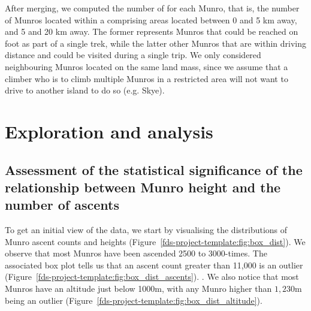 \documentclass[11pt,a4paper]{article}
\begin{document}
After merging, we computed the number of  for each Munro, that is, the number of Munros located within a  comprising areas located between 0 and 5 km away, and 5 and 20 km away. The former represents Munros that could be reached on foot as part of a single trek, while the latter other Munros that are within driving distance and could be visited during a single trip. We only considered neighbouring Munros located on the same land mass, since we assume that a climber who is to climb multiple Munros in a restricted area will not want to drive to another island to do so (e.g. Skye).


\section{Exploration and  analysis}


\subsection{Assessment of the statistical significance of the relationship between Munro height and the number of ascents}
To get an initial view of the data, we start by visualising the distributions of Munro ascent counts and heights (Figure~\ref{fds-project-template:fig:box_dist}). We observe that most Munros have been ascended 2500 to 3000-times. The associated box plot tells us that an ascent count greater than 11,000 is an outlier (Figure~\ref{fds-project-template:fig:box_dist_ascents}). . We also notice that most Munros have an altitude just below 1000m, with any Munro higher than $1,230$m being an outlier (Figure~\ref{fds-project-template:fig:box_dist_altitude}).
\end{document}
